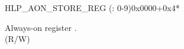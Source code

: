 \begin{register}{H}{LP\_AON\_STORE\_REG (: 0-9)}{0x0000+0x4*}\label{regdesc:LPAONSTORENREG}
%
\regnewline%
\begin{regdesc}\begin{reglist}
\label{fielddesc:LPAONSTOREN}\item [LP\_AON\_STORE\regindex{n}] Always-on register . \\(R/W)
\end{reglist}\end{regdesc}
\end{register}
